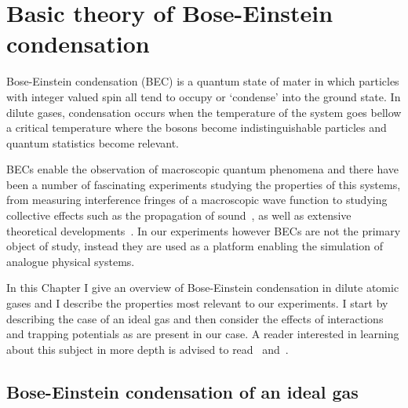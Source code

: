 
\renewcommand{\thechapter}{2}

\chapter{Basic theory of Bose-Einstein condensation}

Bose-Einstein condensation (BEC) is a quantum state of mater in which particles with integer valued spin all tend to occupy or `condense' into the ground state. In dilute gases, condensation occurs when the temperature of the system goes bellow a critical temperature where the bosons become indistinguishable particles and quantum statistics become relevant. 

BECs enable the observation of macroscopic quantum phenomena and there have been a number of fascinating experiments studying the properties of this systems, from measuring interference fringes of a macroscopic wave function to studying collective effects such as the propagation of sound~\cite{ketterle_w._making_1999}, as well as extensive theoretical developments~\cite{dalfovo_theory_1999}. In our experiments however BECs are not the primary object of study, instead they are used as a platform enabling the simulation of analogue physical systems. 

In this Chapter I give an overview of Bose-Einstein condensation in dilute atomic gases and I describe the properties most relevant to our experiments. I start by describing the case of an ideal gas and then consider the effects of interactions and trapping potentials as are present in our case. A reader interested in learning about this subject in more depth is advised to read~\cite{Pethick} and~\cite{noauthor_bose-einstein_2003}.

\section{Bose-Einstein condensation of an ideal gas}

